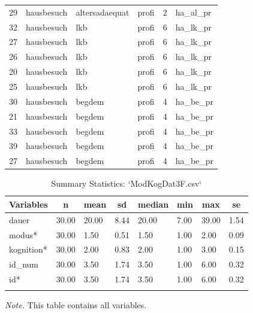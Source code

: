 \documentclass[
  doc,floatsintext]{apa6}
\begin{document}
\begin{table}[tbp]
\begin{center}
\begin{threeparttable}
\begin{tabular}{llllll}
29 & hausbesuch & altersadaequat & profi & 2 & ha\_al\_pr\\
32 & hausbesuch & lkb & profi & 6 & ha\_lk\_pr\\
27 & hausbesuch & lkb & profi & 6 & ha\_lk\_pr\\
26 & hausbesuch & lkb & profi & 6 & ha\_lk\_pr\\
20 & hausbesuch & lkb & profi & 6 & ha\_lk\_pr\\
25 & hausbesuch & lkb & profi & 6 & ha\_lk\_pr\\
30 & hausbesuch & begdem & profi & 4 & ha\_be\_pr\\
21 & hausbesuch & begdem & profi & 4 & ha\_be\_pr\\
33 & hausbesuch & begdem & profi & 4 & ha\_be\_pr\\
39 & hausbesuch & begdem & profi & 4 & ha\_be\_pr\\
27 & hausbesuch & begdem & profi & 4 & ha\_be\_pr\\
\bottomrule
\end{tabular}

\end{threeparttable}
\end{center}

\end{table}

\begin{table}[tbp]

\begin{center}
\begin{threeparttable}

\caption{\label{tab:tabsumstat3}Summary Statistics: `ModKogDat3F.csv`}

\begin{tabular}{llllllll}
\toprule
Variables & \multicolumn{1}{c}{n} & \multicolumn{1}{c}{mean} & \multicolumn{1}{c}{sd} & \multicolumn{1}{c}{median} & \multicolumn{1}{c}{min} & \multicolumn{1}{c}{max} & \multicolumn{1}{c}{se}\\
\midrule
dauer & 30.00 & 20.00 & 8.44 & 20.00 & 7.00 & 39.00 & 1.54\\
modus* & 30.00 & 1.50 & 0.51 & 1.50 & 1.00 & 2.00 & 0.09\\
kognition* & 30.00 & 2.00 & 0.83 & 2.00 & 1.00 & 3.00 & 0.15\\
id\_num & 30.00 & 3.50 & 1.74 & 3.50 & 1.00 & 6.00 & 0.32\\
id* & 30.00 & 3.50 & 1.74 & 3.50 & 1.00 & 6.00 & 0.32\\
\bottomrule
\addlinespace
\end{tabular}

\begin{tablenotes}[para]
\normalsize{\textit{Note.} This table contains all variables.}
\end{tablenotes}

\end{threeparttable}
\end{center}

\end{table}
\end{document}
